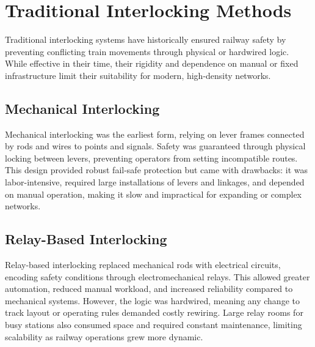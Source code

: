 \section{Traditional Interlocking Methods}

Traditional interlocking systems have historically ensured railway safety by preventing conflicting train movements through physical or hardwired logic. While effective in their time, their rigidity and dependence on manual or fixed infrastructure limit their suitability for modern, high-density networks.

\subsection{Mechanical Interlocking}

Mechanical interlocking was the earliest form, relying on lever frames connected by rods and wires to points and signals. Safety was guaranteed through physical locking between levers, preventing operators from setting incompatible routes. This design provided robust fail-safe protection but came with drawbacks: it was labor-intensive, required large installations of levers and linkages, and depended on manual operation, making it slow and impractical for expanding or complex networks.

\subsection{Relay-Based Interlocking}

Relay-based interlocking replaced mechanical rods with electrical circuits, encoding safety conditions through electromechanical relays. This allowed greater automation, reduced manual workload, and increased reliability compared to mechanical systems. However, the logic was hardwired, meaning any change to track layout or operating rules demanded costly rewiring. Large relay rooms for busy stations also consumed space and required constant maintenance, limiting scalability as railway operations grew more dynamic.